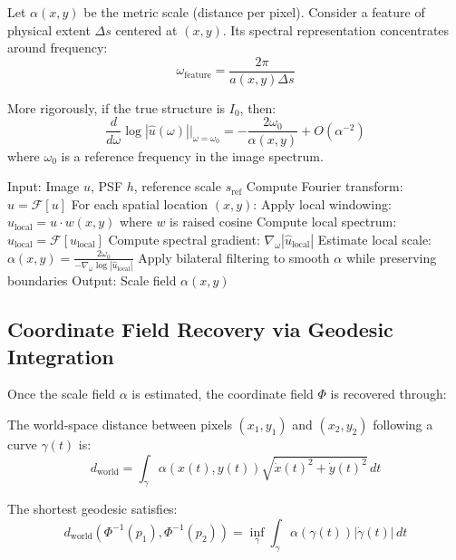 \documentclass[twocolumn,11pt]{article}
\begin{document}
\begin{theorem}
Let $\alpha(x,y)$ be the metric scale (distance per pixel). Consider a feature of physical extent $\Delta s$ centered at $(x,y)$. Its spectral representation concentrates around frequency:
\begin{equation}
\omega_{\text{feature}} = \frac{2\pi}{a(x,y) \Delta s}
\end{equation}

More rigorously, if the true structure is $I_0$, then:
\begin{equation}
\frac{d}{d\omega} \log |\hat{u}(\omega)| \Big|_{\omega=\omega_0} = -\frac{2\omega_0}{\alpha(x,y)} + O(\alpha^{-2})
\end{equation}
where $\omega_0$ is a reference frequency in the image spectrum.
\end{theorem}

\begin{algorithm}
\caption{Spectral Scale Field Estimation}
\begin{algorithmic}[1]
\State Input: Image $u$, PSF $h$, reference scale $s_{\text{ref}}$
\State Compute Fourier transform: $\hat{u} = \mathcal{F}[u]$
\State For each spatial location $(x,y)$:
  \State \quad Apply local windowing: $u_{\text{local}} = u \cdot w(x,y)$ where $w$ is raised cosine
  \State \quad Compute local spectrum: $\hat{u}_{\text{local}} = \mathcal{F}[u_{\text{local}}]$
  \State \quad Compute spectral gradient: $\nabla_\omega |\hat{u}_{\text{local}}|$
  \State \quad Estimate local scale: $\alpha(x,y) = \frac{2\omega_0}{-\nabla_\omega \log|\hat{u}_{\text{local}}|}$
\State \quad Apply bilateral filtering to smooth $\alpha$ while preserving boundaries
\State Output: Scale field $\alpha(x,y)$
\end{algorithmic}
\end{algorithm}

\subsection{Coordinate Field Recovery via Geodesic Integration}

Once the scale field $\alpha$ is estimated, the coordinate field $\Phi$ is recovered through:

\begin{definition}
The world-space distance between pixels $(x_1, y_1)$ and $(x_2, y_2)$ following a curve $\gamma(t)$ is:
\begin{equation}
d_{\text{world}} = \int_\gamma \alpha(x(t), y(t)) \sqrt{\dot{x}(t)^2 + \dot{y}(t)^2} \, dt
\end{equation}

The shortest geodesic satisfies:
\begin{equation}
d_{\text{world}}(\Phi^{-1}(p_1), \Phi^{-1}(p_2)) = \inf_\gamma \int_\gamma \alpha(\gamma(t)) |\dot{\gamma}(t)| \, dt
\end{equation}
\end{definition}
\end{document}
